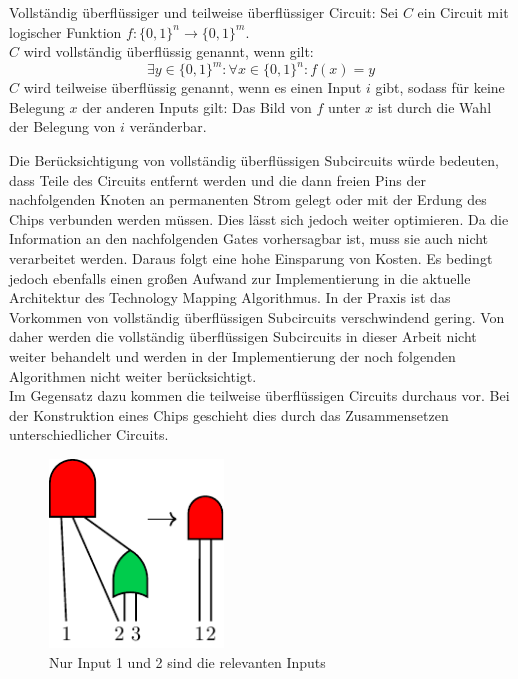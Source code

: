 \documentclass[11pt, a4paper, german]{article}
\newcommand{\TM}{Technology  Mapping }
\begin{document}
 \begin{definition}{Vollständig überflüssiger und teilweise überflüssiger Circuit: }
 	Sei $C$ ein Circuit mit logischer Funktion $ f : \{ 0 , 1 \}^n \rightarrow \{ 0 , 1 \}^m $.\\
 	$C$ wird vollständig überflüssig genannt, wenn gilt:
 	\[  \exists y \in \{0,1 \}^m :\forall x \in \{ 0, 1\}^n : f(x) = y  \]
 	$C$ wird teilweise überflüssig genannt, wenn es einen Input $i$ gibt, sodass für keine Belegung $x$ der anderen Inputs gilt: Das Bild von $f$ unter $x$ ist durch die Wahl der Belegung von $i$ veränderbar.
 \end{definition}
 
Die Berücksichtigung von vollständig überflüssigen Subcircuits würde bedeuten, dass Teile des Circuits entfernt werden und die dann freien Pins der nachfolgenden Knoten an permanenten Strom gelegt oder mit der Erdung des Chips verbunden werden müssen. Dies lässt sich jedoch weiter optimieren. Da die Information an den nachfolgenden Gates vorhersagbar ist, muss sie auch nicht verarbeitet werden. Daraus folgt eine hohe Einsparung von Kosten. Es bedingt jedoch ebenfalls einen großen Aufwand zur Implementierung in die aktuelle Architektur des \TM Algorithmus. In der Praxis ist das Vorkommen von  vollständig überflüssigen Subcircuits verschwindend gering. Von daher werden die vollständig überflüssigen Subcircuits in dieser Arbeit nicht weiter behandelt und werden in der Implementierung der noch folgenden Algorithmen nicht weiter berücksichtigt. \\
Im Gegensatz dazu kommen die teilweise überflüssigen Circuits durchaus vor. Bei der Konstruktion eines Chips geschieht dies durch das Zusammensetzen unterschiedlicher Circuits.\\
 \begin{figure}
		\includegraphics[height = 5cm]{pictures/compiled/partly_redundant}
		\caption{Nur Input 1 und 2 sind die relevanten Inputs}
		\label{bild:partly_redundant}
\end{figure}
\end{document}
